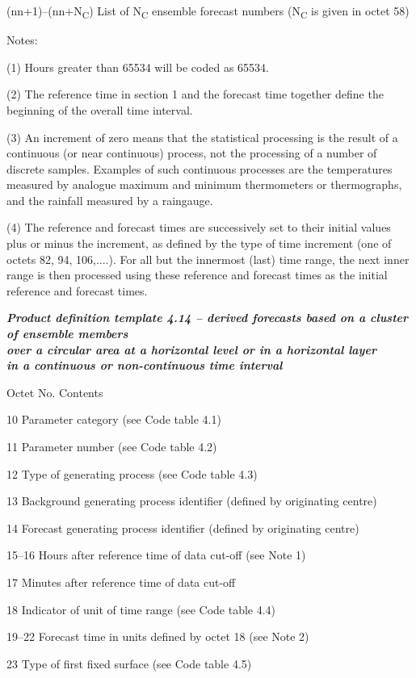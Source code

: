 (nn+1)--(nn+N\textsubscript{C}) List of N\textsubscript{C} ensemble forecast numbers (N\textsubscript{C} is given in octet 58)

Notes:

(1) Hours greater than 65534 will be coded as 65534.

(2) The reference time in section 1 and the forecast time together define the beginning of the overall time interval.

(3) An increment of zero means that the statistical processing is the result of a continuous (or near continuous) process, not the processing of a number of discrete samples. Examples of such continuous processes are the temperatures measured by analogue maximum and minimum thermometers or thermographs, and the rainfall measured by a raingauge.

(4) The reference and forecast times are successively set to their initial values plus or minus the increment, as defined by the type of time increment (one of octets 82, 94, 106,....). For all but the innermost (last) time range, the next inner range is then processed using these reference and forecast times as the initial reference and forecast times.

\emph{\textbf{Product definition template 4.14 -- derived forecasts based on a cluster of ensemble members\\
over a circular area at a horizontal level or in a horizontal layer\\
in a continuous or non-continuous time interval}}

Octet No. Contents

10 Parameter category (see Code table 4.1)

11 Parameter number (see Code table 4.2)

12 Type of generating process (see Code table 4.3)

13 Background generating process identifier (defined by originating centre)

14 Forecast generating process identifier (defined by originating centre)

15--16 Hours after reference time of data cut-off (see Note 1)

17 Minutes after reference time of data cut-off

18 Indicator of unit of time range (see Code table 4.4)

19--22 Forecast time in units defined by octet 18 (see Note 2)

23 Type of first fixed surface (see Code table 4.5)


